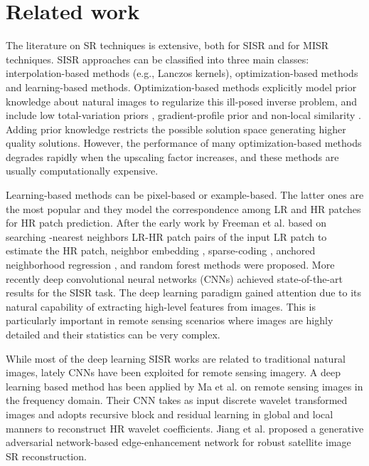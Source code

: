 \documentclass[journal]{IEEEtran}
\begin{document}
\section{Related work}
\label{sec:relatedWork}
The literature on SR techniques is extensive, both for SISR and for MISR techniques.
SISR approaches can be classified into three main classes: interpolation-based methods (e.g., Lanczos kernels), optimization-based methods and learning-based methods.
Optimization-based methods explicitly model prior knowledge about natural images to regularize this ill-posed inverse problem, and include low total-variation priors \cite{ng2007total},  gradient-profile prior \cite{articleSun2010,6414620} and non-local similarity \cite{4694003,6241428,Zhang2013SingleIS}. Adding prior knowledge restricts the possible solution space generating higher quality solutions. However, the performance of many optimization-based methods degrades rapidly when the upscaling factor increases, and these methods are usually computationally expensive.

Learning-based methods can be pixel-based or example-based. The latter ones are the most popular and they model the correspondence among LR and HR patches for HR patch prediction. After the early work by Freeman et al. \cite{988747} based on searching -nearest neighbors LR-HR patch pairs of the input LR patch to estimate the HR patch, neighbor embedding \cite{1315043,6166881,Bevilacqua2012LowComplexitySS}, sparse-coding \cite{5466111,6175956,5396341,6392274,10.1007/978-3-642-27413-8_47}, anchored neighborhood regression \cite{6751349}, and random forest \cite{7299003} methods were proposed.
More recently deep convolutional neural networks (CNNs) \cite{DnCnnZhang, liu2018non,10.1007/978-3-319-10593-2_13,kim2016deep,kim2015deep_rec,Shi2016RealTimeSI,Lim2017EnhancedDR,Zhang2018ResidualDN} achieved state-of-the-art results for the SISR task. The deep learning paradigm gained attention due to its natural capability of extracting high-level features from images. This is particularly important in remote sensing scenarios where images are highly detailed and their statistics can be very complex.

While most of the deep learning SISR works are related to traditional natural images, lately CNNs have been exploited for remote sensing imagery.
A deep learning based method has been applied by Ma et al. \cite{8600724} on remote sensing images in the frequency domain. Their CNN takes as input discrete wavelet transformed images and adopts recursive block and residual learning in global and local manners to reconstruct HR wavelet coefficients. Jiang et al. \cite{8677274} proposed a generative adversarial network-based edge-enhancement network for robust satellite image SR reconstruction.
\end{document}
